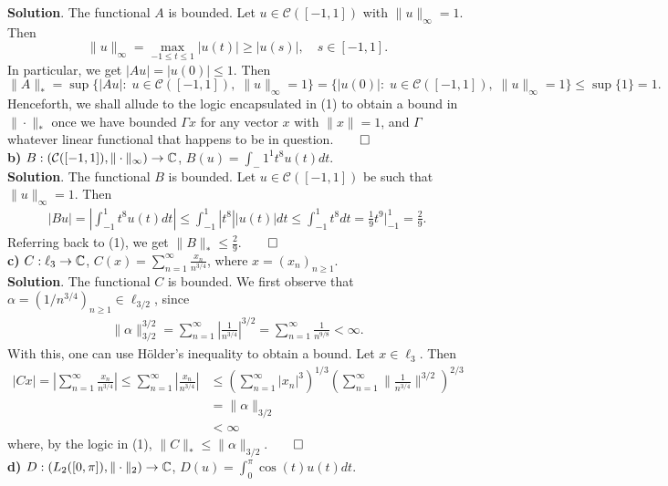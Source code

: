 \documentclass[10pt]{article}
\newcommand{\1}[1]{\mathbbm{1}_{#1}} \newcommand{\mc}[1]{\mathcal{#1}}
\begin{document}
    {\bf Solution}. The functional $A$ is bounded. Let $u\in \mc{C}([-1,1])$ with $\|u\|_\infty=1$. Then
    \[\|u\|_\infty=\max_{-1\leq t\leq 1}|u(t)|\geq |u(s)|,\quad s\in[-1,1].\]
    In particular, we get $|Au|=|u(0)|\leq 1$. Then
    \[\|A\|_\ast=\sup\{|Au|:\;u\in \mc{C}([-1,1]),\;\|u\|_\infty=1\}=\{|u(0)|:\;u\in \mc{C}([-1,1]),\;\|u\|_\infty=1\}\leq\sup\{1\}=1.\tag{1}\]
    Henceforth, we shall allude to the logic encapsulated in (1) to obtain a bound in $\|\cdot\|_\ast$ once we have bounded $\Gamma x$ for any vector $x$ with $\|x\|=1$, and $\Gamma$
    whatever linear functional that happens to be in question.\hfill{$\qed$}\\[5pt]
    {\bf b)} $B:(\mc{C}([-1,1]),\|\cdot\|_\infty)\rightarrow\mbb{C}$, $B(u)=\int_-1^1t^8u(t)dt$.\\[5pt]
    {\bf Solution}. The functional $B$ is bounded. Let $u\in \mc{C}([-1,1])$ be such that $\|u\|_\infty=1$. Then
    \begin{align*}
        |Bu|=\left|\int_{-1}^1t^8u(t)dt\right|\leq \int_{-1}^1|t^8||u(t)|dt\leq \int_{-1}^1t^8dt=\frac{1}{9}t^9\bigg|^{1}_{-1}=\frac{2}{9}.
    \end{align*}
    Referring back to (1), we get $\|B\|_\ast\leq\frac{2}{9}$.\hfill{$\qed$}\\[5pt]
    {\bf c)} $C:\ell_3\rightarrow\mathbb{C}$, $C(x)=\sum_{n=1}^\infty\frac{x_n}{n^{3/4}}$, where $x=(x_{n})_{n\geq 1}$.\\[5pt]
    {\bf Solution}. The functional $C$ is bounded. We first observe that $\alpha=(1/n^{3/4})_{n\geq 1}\in\ell_{3/2}$, since
    \begin{align*}
        \|\alpha\|_{3/2}^{3/2}=\sum_{n=1}^\infty\left|\frac{1}{n^{3/4}}\right|^{3/2}=\sum_{n=1}^\infty\frac{1}{n^{9/8}}<\infty.
    \end{align*}
    With this, one can use H\"older's inequality to obtain a bound. Let $x\in\ell_3$. Then
    \begin{align*}
        |Cx|=\left|\sum_{n=1}^\infty\frac{x_n}{n^{3/4}}\right|\leq \sum_{n=1}^\infty\left|\frac{x_n}{n^{3/4}}\right|&\leq\left(\sum_{n=1}^\infty|x_n|^3\right)^{1/3}\left(\sum_{n=1}^\infty\|\frac{1}{n^{3/4}}\|^{3/2}\right)^{2/3}\\
        &=\|\alpha\|_{3/2}\\
        &<\infty
    \end{align*}
    where, by the logic in (1), $\|C\|_\ast\leq \|\alpha\|_{3/2}$.\hfill{$\qed$}\\[5pt]
    {\bf d)} $D:(L_2([0,\pi]),\|\cdot\|_2)\rightarrow\mathbb{C}$, $D(u)=\int_0^\pi\cos(t)u(t)dt$.\\[5pt]
\end{document}
